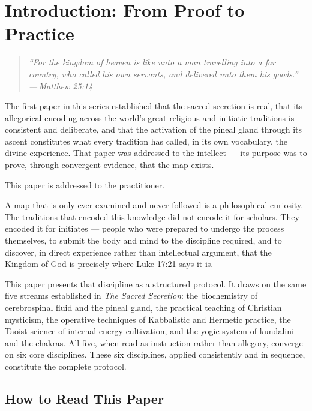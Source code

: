 \documentclass[12pt, a4paper]{article}
\newcommand{\epigraph}[2]{%
  \begin{quote}
    \itshape ``#1''\\[0.3em]
    \normalfont\small\hfill ---\,#2
  \end{quote}
}
\begin{document}
\newpage
\tableofcontents
\newpage

\section{Introduction: From Proof to Practice}

\epigraph{For the kingdom of heaven is like unto a man travelling into a far
country, who called his own servants, and delivered unto them his goods.}{Matthew
25:14}

The first paper in this series established that the sacred secretion is real,
that its allegorical encoding across the world's great religious and initiatic
traditions is consistent and deliberate, and that the activation of the pineal
gland through its ascent constitutes what every tradition has called, in its
own vocabulary, the divine experience. That paper was addressed to the
intellect — its purpose was to prove, through convergent evidence, that the
map exists.

This paper is addressed to the practitioner.

A map that is only ever examined and never followed is a philosophical
curiosity. The traditions that encoded this knowledge did not encode it for
scholars. They encoded it for initiates — people who were prepared to undergo
the process themselves, to submit the body and mind to the discipline required,
and to discover, in direct experience rather than intellectual argument, that
the Kingdom of God is precisely where Luke 17:21 says it is.

This paper presents that discipline as a structured protocol. It draws on the
same five streams established in \emph{The Sacred Secretion}: the biochemistry
of cerebrospinal fluid and the pineal gland, the practical teaching of
Christian mysticism, the operative techniques of Kabbalistic and Hermetic
practice, the Taoist science of internal energy cultivation, and the yogic
system of kundalini and the chakras. All five, when read as instruction rather
than allegory, converge on six core disciplines. These six disciplines, applied
consistently and in sequence, constitute the complete protocol.

\subsection{How to Read This Paper}
\end{document}
